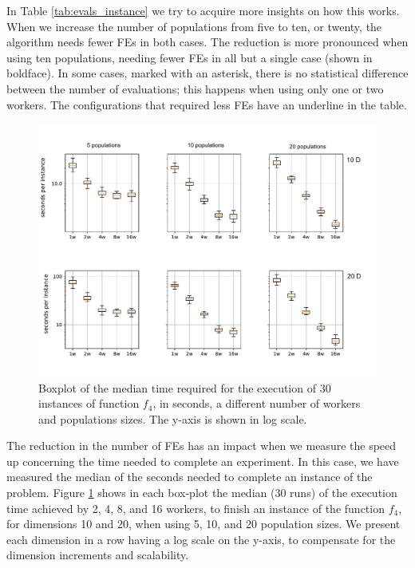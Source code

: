 \documentclass[review]{elsarticle}
\begin{document}
In Table \ref{tab:evals_instance} we try to acquire more insights on
how this works. When we increase the number of populations from five to ten, or twenty,
the algorithm needs fewer FEs in both cases. The reduction is more pronounced
when using ten populations, needing fewer FEs in all but a single case (shown in
boldface). In some cases, marked with an asterisk, there is no statistical
difference between the number of evaluations; this happens when using only one
or two workers. The configurations that required less FEs have an underline in
the table.

%
\begin{figure}[h!tbp]
  \centering
  \includegraphics[width=\textwidth]{secs_per_instance}
  \caption{Boxplot of the median time required for the execution of 30 
  instances of function $f_4$, in seconds, a different number of workers and 
  populations sizes. The y-axis is shown in log scale.}
  \label{fig:spworker:time}
\end{figure}
%

The reduction in the number of FEs has an impact when we measure the speed up
concerning the time needed to complete an experiment. In this case, we have
measured the median of the seconds needed to complete an instance of the
problem. Figure \ref{fig:spworker:time} shows in each box-plot the median (30
runs) of the execution time achieved by 2, 4, 8, and 16 workers, to finish an
instance of the function $f_4$, for dimensions 10 and 20, when using 5, 10, and
20 population sizes. We present each dimension in a row having a log scale on
the y-axis, to compensate for the dimension increments and scalability.  
 
\end{document}
